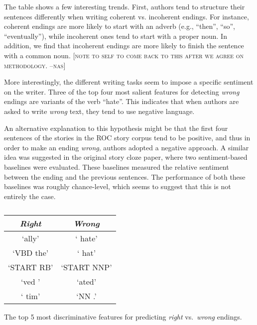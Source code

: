 \documentclass[11pt,a4paper]{article}
\newcommand{\resolved}[1]{}
\newcommand{\roy}[1]{{\color{orange}\textsc{[#1 --rs]}}}
\newcommand{\yc}[1]{{\color{bblue}\{\textit{#1}\}$_{yc}$}}
\newcommand{\nascomment}[1]{{\color{blue}\textsc{[#1 --nas]}}}
\renewcommand{\roy}[1]{}
\begin{document}
The table shows a few interesting trends. 
First, authors tend to structure their sentences differently when writing {coherent}  vs. {incoherent} endings.
For instance, {coherent} endings are more likely to start with an adverb (e.g., ``then'', ``so'', ``eventually''), while {incoherent} ones tend to start with a proper noun.
In addition, we find that {incoherent} endings are more likely to
finish the sentence with a common noun.  \nascomment{note to self to come back
  to this after we agree on methodology.}

More interestingly, the different writing tasks seem to impose a specific sentiment on the writer. 
Three of the top four most salient features for detecting {\it wrong} endings are variants of the verb ``hate''.
This indicates that when authors are asked to write {\it wrong} text, they tend to use negative language.

An alternative explanation to this hypothesis might be that the first four sentences of the stories in the ROC story corpus tend to be positive, and thus in order to make an ending {\it wrong}, authors adopted a negative approach. 
A similar idea was suggested in the original story cloze paper, where two sentiment-based baselines were evaluated. 
These baselines measured the relative sentiment between the ending and the previous sentences.
The performance of both these baselines was roughly chance-level, which seems to suggest that this is not entirely the case.
\resolved{\yc{Is it really because there's no statistical tendency in the original stories to have happy endings, as opposed to the alternative possibility --- the sentiment classifier used by Monstafazadeh 2016 didn't quite nail down the optimal feature encodings?}} \roy{this is definitely an option, and that's partly why I used hedging (``seems to suggest''). Tones it down a bit more.}

\begin{table}[!t]
\begin{center}
\begin{tabular}{|c|c|} \hline
\textit{\textbf{Right}} & \textit{\textbf{Wrong}}\\ \hline
`ally' & ` hate'\\ \hline
`VBD the' & ` hat'\\ \hline
`START RB' & `START NNP'\\ \hline
`ved ' & `ated'\\ \hline
` tim' & `NN .'\\ \hline

\end{tabular}
\end{center}
\caption{\label{exp1_features}}
The top 5 most discriminative features for predicting {\it right} vs.~{\it wrong} endings.\end{table}
\end{document}
